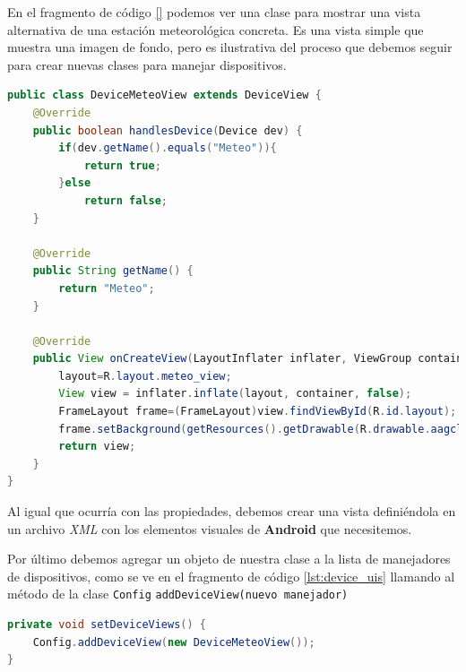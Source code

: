 \bigskip
En el fragmento de código \ref{} podemos ver una clase para mostrar una vista alternativa de una estación meteorológica concreta. Es una vista simple que muestra una imagen de fondo, pero es ilustrativa del proceso que debemos seguir para crear nuevas clases para manejar dispositivos.

\begin{lstlisting}[language=Java,caption={Clase abstracta DeviceView},label={lst:device_view}]
public class DeviceMeteoView extends DeviceView {
    @Override
    public boolean handlesDevice(Device dev) {
        if(dev.getName().equals("Meteo")){
            return true;
        }else
            return false;
    }

    @Override
    public String getName() {
        return "Meteo";
    }

    @Override
    public View onCreateView(LayoutInflater inflater, ViewGroup container, Bundle savedInstanceState) {
        layout=R.layout.meteo_view;
        View view = inflater.inflate(layout, container, false);
        FrameLayout frame=(FrameLayout)view.findViewById(R.id.layout);
        frame.setBackground(getResources().getDrawable(R.drawable.aagcloudwatcher));
        return view;
    }
}

\end{lstlisting}

\bigskip
Al igual que ocurría con las propiedades, debemos crear una vista definiéndola en un archivo \textit{XML} con los elementos visuales de \textbf{Android} que necesitemos.

\bigskip
Por último debemos agregar un objeto de nuestra clase a la lista de manejadores de dispositivos, como se ve en el fragmento de código \ref{lst:device_uis} llamando al método de la clase \texttt{Config} \texttt{addDeviceView(nuevo manejador)}

\begin{lstlisting}[language=Java,caption={Lista de objetos manejadores de dispositivos},label={lst:device_uis}]
private void setDeviceViews() {
    Config.addDeviceView(new DeviceMeteoView());
}

\end{lstlisting}